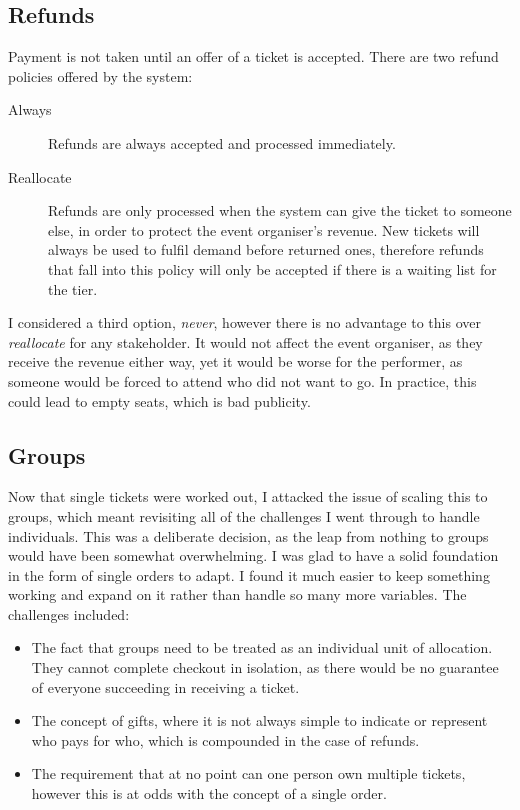 \documentclass[12pt,a4paper]{bhamdissertation}
\begin{document}
\subsection{Refunds}

Payment is not taken until an offer of a ticket is accepted. There are two refund policies offered by the system:

\begin{description}
    \item[Always] Refunds are always accepted and processed immediately.
    \item[Reallocate] Refunds are only processed when the system can give the ticket to someone else, in order to protect the event organiser's revenue. New tickets will always be used to fulfil demand before returned ones, therefore refunds that fall into this policy will only be accepted if there is a waiting list for the tier.
\end{description}

I considered a third option, \textit{never}, however there is no advantage to this over \textit{reallocate} for any stakeholder. It would not affect the event organiser, as they receive the revenue either way, yet it would be worse for the performer, as someone would be forced to attend who did not want to go. In practice, this could lead to empty seats, which is bad publicity.

\subsection{Groups}

Now that single tickets were worked out, I attacked the issue of scaling this to groups, which meant revisiting all of the challenges I went through to handle individuals. This was a deliberate decision, as the leap from nothing to groups would have been somewhat overwhelming. I was glad to have a solid foundation in the form of single orders to adapt. I found it much easier to keep something working and expand on it rather than handle so many more variables. The challenges included:

\begin{itemize}
    \item The fact that groups need to be treated as an individual unit of allocation. They cannot complete checkout in isolation, as there would be no guarantee of everyone succeeding in receiving a ticket.
    \item The concept of gifts, where it is not always simple to indicate or represent who pays for who, which is compounded in the case of refunds.
    \item The requirement that at no point can one person own multiple tickets, however this is at odds with the concept of a single order.
\end{itemize}
\end{document}
